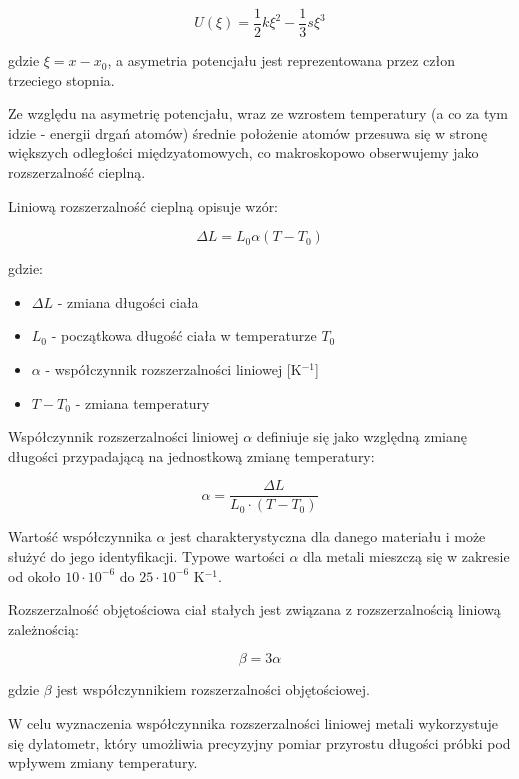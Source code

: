 \documentclass[a4paper,12pt]{article}
\begin{document}
\begin{equation}
    U(\xi) = \frac{1}{2}k\xi^2 - \frac{1}{3}s\xi^3
\end{equation}

gdzie $\xi = x - x_0$, a asymetria potencjału jest reprezentowana przez człon trzeciego stopnia.

Ze względu na asymetrię potencjału, wraz ze wzrostem temperatury (a co za tym idzie - energii drgań atomów) średnie położenie atomów przesuwa się w stronę większych odległości międzyatomowych, co makroskopowo obserwujemy jako rozszerzalność cieplną.

Liniową rozszerzalność cieplną opisuje wzór:

\begin{equation}
    \Delta L = L_0 \alpha (T - T_0)
\end{equation}

gdzie:
\begin{itemize}
    \item $\Delta L$ - zmiana długości ciała
    \item $L_0$ - początkowa długość ciała w temperaturze $T_0$
    \item $\alpha$ - współczynnik rozszerzalności liniowej [K$^{-1}$]
    \item $T - T_0$ - zmiana temperatury
\end{itemize}

Współczynnik rozszerzalności liniowej $\alpha$ definiuje się jako względną zmianę długości przypadającą na jednostkową zmianę temperatury:

\begin{equation}
    \alpha = \frac{\Delta L}{L_0 \cdot (T - T_0)}
\end{equation}

Wartość współczynnika $\alpha$ jest charakterystyczna dla danego materiału i może służyć do jego identyfikacji. Typowe wartości $\alpha$ dla metali mieszczą się w zakresie od około $10 \cdot 10^{-6}$ do $25 \cdot 10^{-6}$ K$^{-1}$.

Rozszerzalność objętościowa ciał stałych jest związana z rozszerzalnością liniową zależnością:

\begin{equation}
    \beta = 3\alpha
\end{equation}

gdzie $\beta$ jest współczynnikiem rozszerzalności objętościowej.

W celu wyznaczenia współczynnika rozszerzalności liniowej metali wykorzystuje się dylatometr, który umożliwia precyzyjny pomiar przyrostu długości próbki pod wpływem zmiany temperatury.
\end{document}
